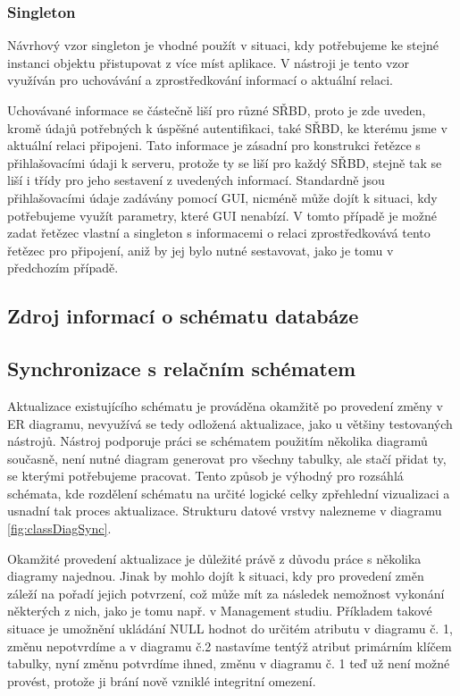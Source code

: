 \documentclass[czech,bachelor,public,dept460,male,oneside]{diploma}
\begin{document}
		\subsubsection{Singleton}
		Návrhový vzor singleton je vhodné použít v situaci, kdy potřebujeme ke stejné instanci objektu přistupovat z více míst aplikace. V nástroji je tento vzor využíván pro uchovávání a zprostředkování informací o aktuální relaci. 
		
		Uchovávané informace se částečně liší pro různé SŘBD, proto je zde uveden, kromě údajů potřebných k úspěšné autentifikaci, také SŘBD, ke kterému jsme v aktuální relaci připojeni. Tato informace je zásadní pro konstrukci řetězce s přihlašovacími údaji k serveru, protože ty se liší pro každý SŘBD, stejně tak se liší i třídy pro jeho sestavení z uvedených informací. Standardně jsou přihlašovacími údaje zadávány pomocí GUI, nicméně může dojít k situaci, kdy potřebujeme využít parametry, které GUI nenabízí. V tomto případě je možné zadat řetězec vlastní a singleton s informacemi o relaci zprostředkovává tento řetězec pro připojení, aniž by jej bylo nutné sestavovat, jako je tomu v předchozím případě.
	
	\subsection{Zdroj informací o schématu databáze} \label{secDataSource}
		
	\subsection{Synchronizace s relačním schématem}
	Aktualizace existujícího schématu je prováděna okamžitě po provedení změny v ER diagramu, nevyužívá se tedy odložená aktualizace, jako u většiny testovaných nástrojů. Nástroj podporuje práci se schématem použitím několika diagramů současně, není nutné diagram generovat pro všechny tabulky, ale stačí přidat ty, se kterými potřebujeme pracovat. Tento způsob je výhodný pro rozsáhlá schémata, kde rozdělení schématu na určité logické celky zpřehlední vizualizaci a usnadní tak proces aktualizace. Strukturu datové vrstvy nalezneme v diagramu \ref{fig:classDiagSync}.
	
	Okamžité provedení aktualizace je důležité právě z důvodu práce s několika diagramy najednou. Jinak by mohlo dojít k situaci, kdy pro provedení změn záleží na pořadí jejich potvrzení, což může mít za následek nemožnost vykonání některých z nich, jako je tomu např. v Management studiu. Příkladem takové situace je umožnění ukládání NULL hodnot do určitém atributu v diagramu č. 1, změnu nepotvrdíme a v diagramu č.2 nastavíme tentýž atribut primárním klíčem tabulky, nyní změnu potvrdíme ihned, změnu v diagramu č. 1 teď už není možné provést, protože ji brání nově vzniklé integritní omezení.
	
\end{document}
